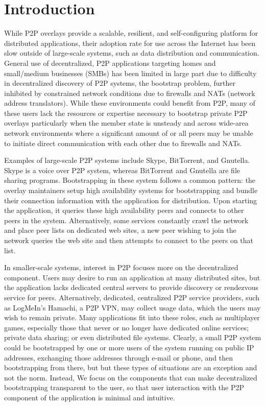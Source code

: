 \documentclass[conference]{IEEEtran}
\begin{document}
\section{Introduction}

While P2P overlays provide a scalable, resilient, and self-configuring platform
for distributed applications, their adoption rate for use across the Internet
has been slow outside of large-scale systems, such as data distribution and
communication.  General use of decentralized, P2P applications targeting homes
and small/medium businesses (SMBs) has been limited in large part due to
difficulty in decentralized discovery of P2P systems, the bootstrap problem,
further inhibited by constrained network conditions due to firewalls and NATs
(network address translators).  While these environments could benefit from
P2P, many of these users lack the resources or expertise necessary to bootstrap
private P2P overlays particularly when the member state is unsteady and across
wide-area network environments where a significant amount of or all peers may
be unable to initiate direct communication with each other due to firewalls and
NATs.

Examples of large-scale P2P systems include Skype, BitTorrent, and Gnutella.
Skype is a voice over P2P system, whereas BitTorrent and Gnutella are file
sharing programs.  Bootstrapping in these system follows a common pattern: the
overlay maintainers setup high availability systems for bootstrapping and
bundle their connection information with the application for distribution.
Upon starting the application, it queries these high availability peers and
connects to other peers in the system.  Alternatively, some services constantly
crawl the network and place peer lists on dedicated web sites, a new peer
wishing to join the network queries the web site and then attempts to connect
to the peers on that list.

In smaller-scale systems, interest in P2P focuses more on the decentralized
component.  Users may desire to run an application at many distributed sites,
but the application lacks dedicated central servers to provide discovery or
rendezvous service for peers.  Alternatively, dedicated, centralized P2P
service providers, such as LogMeIn's Hamachi, a P2P VPN, may collect usage
data, which the users may wish to remain private.  Many applications fit into
these roles, such as multiplayer games, especially those that never or no
longer have dedicated online services; private data sharing; or even
distributed file systems.  Clearly, a small P2P system could be bootstrapped by
one or more users of the system running on public IP addresses, exchanging
those addresses through e-mail or phone, and then bootstrapping from there, but
but these types of situations are an exception and not the norm.  Instead, We
focus on the components that can make decentralized bootstrapping transparent
to the user, so that user interaction with the P2P component of the application
is minimal and intuitive.
\end{document}
